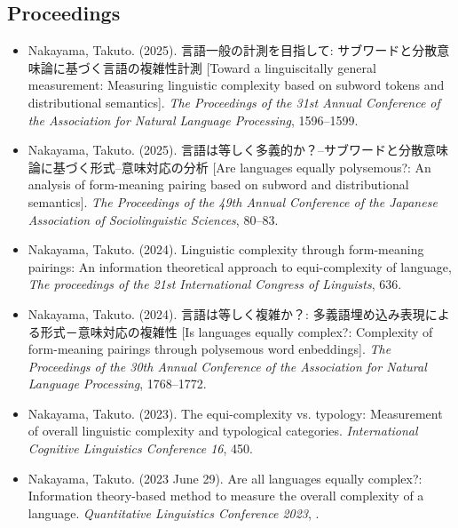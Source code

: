 \documentclass[a4paper,11pt]{article}
\begin{document}
\subsection*{Proceedings}
\begin{itemize}[leftmargin=*, itemsep=0em, topsep=0em]
  \item Nakayama, Takuto. (2025). 言語一般の計測を目指して: サブワードと分散意味論に基づく言語の複雑性計測 [Toward a linguiscitally general measurement: Measuring linguistic complexity based on subword tokens and distributional semantics]. \textit{The Proceedings of the 31st Annual Conference of the Association for Natural Language Processing}, 1596–1599.
  \item Nakayama, Takuto. (2025). 言語は等しく多義的か？–サブワードと分散意味論に基づく形式–意味対応の分析 [Are languages equally polysemous?: An analysis of form-meaning pairing based on subword and distributional semantics]. \textit{The Proceedings of the 49th Annual Conference of the Japanese Association of Sociolinguistic Sciences}, 80–83.
  \item Nakayama, Takuto. (2024). Linguistic complexity through form-meaning pairings: An information theoretical approach to equi-complexity of language, \textit{The proceedings of the 21st International Congress of Linguists}, 636.
  \item Nakayama, Takuto. (2024). 言語は等しく複雑か？: 多義語埋め込み表現による形式－意味対応の複雑性 [Is languages equally complex?: Complexity of form-meaning pairings through polysemous word enbeddings]. \textit{The Proceedings of the 30th Annual Conference of the Association for Natural Language Processing}, 1768–1772.
  \item Nakayama, Takuto. (2023). The equi-complexity vs. typology: Measurement of overall linguistic complexity and typological categories. \textit{International Cognitive Linguistics Conference 16}, 450.
  \item Nakayama, Takuto. (2023 June 29). Are all languages equally complex?: Information theory-based method to measure the overall complexity of a language. \textit{Quantitative Linguistics Conference 2023}, .
\end{itemize}

\vspace{1em}
\end{document}
